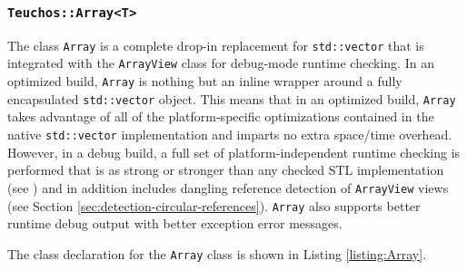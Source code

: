 \documentclass[pdf,ps2pdf,11pt]{SANDreport}
\begin{document}
%
{}\subsubsection{\texttt{Teuchos::Array<T>}}
\label{sec:Array}
%

The class {}\texttt{Array} is a complete drop-in replacement for
{}\texttt{std::vector} that is integrated with the
{}\texttt{ArrayView} class for debug-mode runtime checking.  In an
optimized build, {}\texttt{Array} is nothing but an inline wrapper
around a fully encapsulated {}\texttt{std::vector} object.  This means
that in an optimized build, {}\texttt{Array} takes advantage of all of
the platform-specific optimizations contained in the native
{}\texttt{std::vector} implementation and imparts no extra space/time
overhead.  However, in a debug build, a full set of
platform-independent runtime checking is performed that is as strong
or stronger than any checked STL implementation (see {}\cite[Item
{}\#83]{C++CodingStandards05}) and in addition includes dangling
reference detection of {}\texttt{ArrayView} views (see Section
{}\ref{sec:detection-circular-references}).  {}\texttt{Array} also
supports better runtime debug output with better exception error
messages.

The class declaration for the {}\texttt{Array} class is shown in
Listing {}\ref{listing:Array}.
\end{document}
